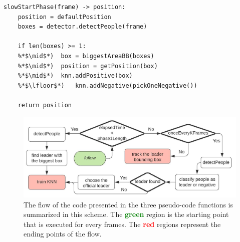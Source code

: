 \begin{lstlisting}[captionpos=b, 
	caption={It is the pseudocode of the first phase. The function \textit{slow start} computes only detections in order to train the KNN people classifier.}, 
	label=alg:slowStartPhase
	]
slowStartPhase(frame) -> position:
	position = defaultPosition
	boxes = detector.detectPeople(frame)
	
	if len(boxes) >= 1:
	%*$\mid$*)	box = biggestAreaBB(boxes)
	%*$\mid$*)	position = getPosition(box)
	%*$\mid$*)	knn.addPositive(box)
	%*$\lfloor$*)	knn.addNegative(pickOneNegative())
	
	return position
\end{lstlisting}
\begin{figure}[!h]
	\centering
	\includegraphics[width=\linewidth]{images/solution/scheme_codeFlow}
	\captionsetup{margin=0.5cm}
	\caption[A representation of the flow of the project code.]{The flow of the code presented in the three pseudo-code functions is summarized in this scheme. The \textbf{\textcolor{green}{green}} region is the starting point that is executed for every frames. The \textbf{\textcolor{red}{red}} regions represent the ending points of the flow.}
	\label{fig:scheme_codeFlow}
\end{figure}
